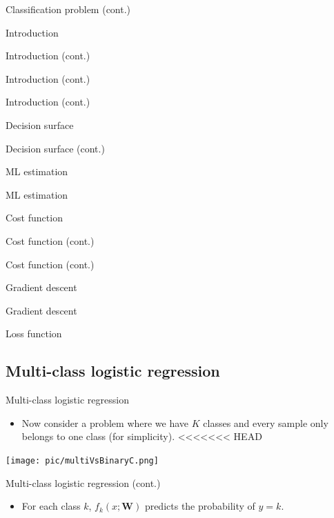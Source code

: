 \documentclass[serif, aspectratio=169]{beamer}
\begin{document}
\begin{frame}{Classification problem (cont.)}
\begin{itemize}
\begin{frame}{Introduction}
\begin{itemize}
\begin{frame}{Introduction (cont.)}
\begin{frame}{Introduction (cont.)}
\begin{frame}{Introduction (cont.)}
\begin{frame}{Decision surface}
\begin{itemize}
\begin{frame}{Decision surface (cont.)}
\begin{frame}{ML estimation}
\begin{frame}{ML estimation}
\begin{itemize}
\begin{frame}{Cost function}
\begin{frame}{Cost function (cont.)}
\begin{itemize}
\begin{itemize}
\begin{frame}{Cost function (cont.)}
\begin{frame}{Gradient descent}
\begin{frame}{Gradient descent}
\begin{frame}{Loss function}
\subsection{Multi-class logistic regression}
\begin{frame}{Multi-class logistic regression}
    \begin{itemize}
        \item Now consider a problem where we have $K$ classes and every sample only belongs to one class (for simplicity).
<<<<<<< HEAD
    \end{itemize}
    \centering
    \texttt{[image: pic/multiVsBinaryC.png]}
\end{frame}
\begin{frame}{Multi-class logistic regression (cont.)}
    \begin{itemize}
<<<<<<< HEAD
         \item For each class $k$, $f_k(x; \mathbf{W})$ predicts the probability of $y=k$.

\end{itemize}
\end{frame}
\end{frame}
\end{frame}
\end{frame}
\end{frame}
\end{itemize}
\end{itemize}
\end{frame}
\end{frame}
\end{itemize}
\end{frame}
\end{frame}
\end{frame}
\end{itemize}
\end{frame}
\end{frame}
\end{frame}
\end{frame}
\end{itemize}
\end{frame}
\end{itemize}
\end{frame}
\end{document}
